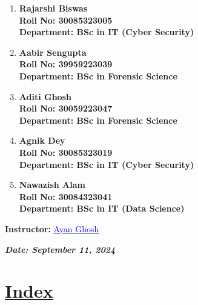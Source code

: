 \documentclass[a4paper,12pt]{article}
\begin{document}
\begin{titlepage}
    \normalsize
    \begin{enumerate}
        \item \textbf{Rajarshi Biswas}\\
              \textbf{Roll No: 30085323005}\\
              \textbf{Department: BSc in IT (Cyber Security)}
        \item \textbf{Aabir Sengupta }\\
              \textbf{Roll No: 39959223039}\\
              \textbf{Department: BSc in Forensic Science}
        \item \textbf{Aditi Ghosh}\\
              \textbf{Roll No: 30059223047}\\
              \textbf{Department: BSc in Forensic Science}
        \item \textbf{Agnik Dey}\\
              \textbf{Roll No: 30085323019}\\
              \textbf{Department: BSc in IT (Cyber Security)}
        \item \textbf{Nawazish Alam}\\
              \textbf{Roll No: 30084323041}\\
              \textbf{Department: BSc in IT (Data Science)}
    \end{enumerate}
    \vspace{0.8 cm}
    
    \textbf{Instructor:} \href{mailto:ayan.ghosh@university.edu}{\textcolor{blue}{Ayan Ghosh}}\\
    \vspace{0.2cm}
    
    \textbf{\textit{Date: September 11, 2024}}

\end{titlepage}
\newpage
{}
\vspace{-2cm}

\centering
\section*{\underline{\Huge\textbf{\textcolor{blue!60}{Index}}}}
\vspace{0.5cm}
\end{document}
